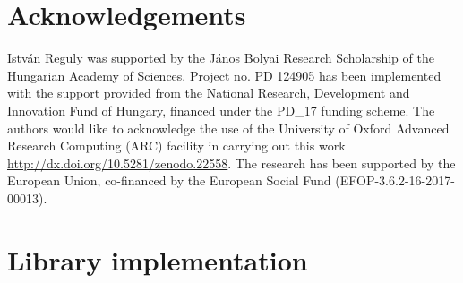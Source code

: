 \documentclass[number]{elsarticle}
\begin{document}


\section*{Acknowledgements}
Istv\'an Reguly was supported by the J\'anos Bolyai Research Scholarship of the Hungarian Academy of Sciences. Project no. PD 124905 has been implemented with the support provided from the National Research, Development and Innovation Fund of Hungary, financed under the PD\_17 funding scheme. The authors would like to acknowledge the use of
the University of Oxford Advanced Research Computing (ARC) facility in carrying
out this work \url{http://dx.doi.org/10.5281/zenodo.22558}. The research has
been supported by the European Union, co-financed by the European Social Fund
(EFOP-3.6.2-16-2017-00013).
%
%



%
%
\appendix

\section{Library implementation}\label{library-implementation}





\end{document}
